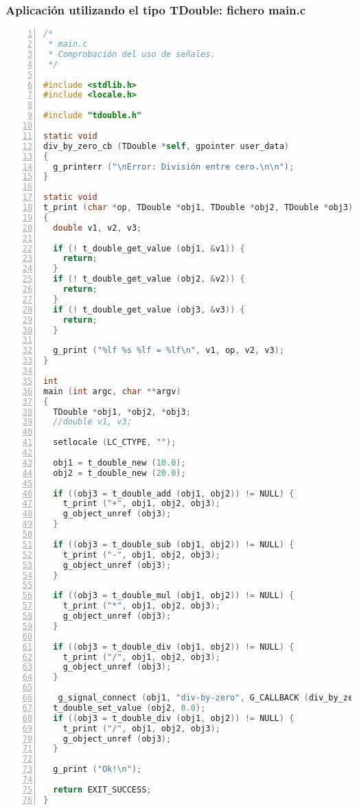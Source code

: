 \subsubsection{Aplicación utilizando el tipo \textsf{TDouble}: fichero \textsf{main.c}}
\begin{lstlisting}[language=C, numbers=left]
/*
 * main.c
 * Comprobación del uso de señales.
 */

#include <stdlib.h>
#include <locale.h>

#include "tdouble.h"

static void
div_by_zero_cb (TDouble *self, gpointer user_data)
{
  g_printerr ("\nError: División entre cero.\n\n");
}

static void
t_print (char *op, TDouble *obj1, TDouble *obj2, TDouble *obj3)
{
  double v1, v2, v3;

  if (! t_double_get_value (obj1, &v1)) {
    return;
  }
  if (! t_double_get_value (obj2, &v2)) {
    return;
  }
  if (! t_double_get_value (obj3, &v3)) {
    return;
  }

  g_print ("%lf %s %lf = %lf\n", v1, op, v2, v3);
}

int
main (int argc, char **argv)
{
  TDouble *obj1, *obj2, *obj3;
  //double v1, v3;

  setlocale (LC_CTYPE, "");

  obj1 = t_double_new (10.0);
  obj2 = t_double_new (20.0);

  if ((obj3 = t_double_add (obj1, obj2)) != NULL) {
    t_print ("+", obj1, obj2, obj3);
    g_object_unref (obj3);
  }

  if ((obj3 = t_double_sub (obj1, obj2)) != NULL) {
    t_print ("-", obj1, obj2, obj3);
    g_object_unref (obj3);
  }

  if ((obj3 = t_double_mul (obj1, obj2)) != NULL) {
    t_print ("*", obj1, obj2, obj3);
    g_object_unref (obj3);
  }
 
  if ((obj3 = t_double_div (obj1, obj2)) != NULL) {
    t_print ("/", obj1, obj2, obj3);
    g_object_unref (obj3);
  }

   g_signal_connect (obj1, "div-by-zero", G_CALLBACK (div_by_zero_cb), NULL);
  t_double_set_value (obj2, 0.0);
  if ((obj3 = t_double_div (obj1, obj2)) != NULL) {
    t_print ("/", obj1, obj2, obj3);
    g_object_unref (obj3);
  }

  g_print ("Ok!\n");

  return EXIT_SUCCESS;
}
\end{lstlisting}

